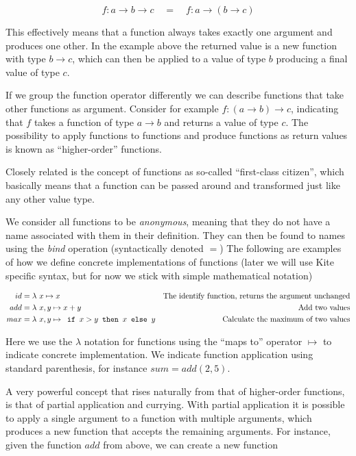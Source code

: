 \[ f: a \to b \to c \quad = \quad f: a \to (b \to c) \]

This effectively means that a function always takes exactly one argument and produces one other. In the example above the returned value is a new function with type $b \to c$, which can then be applied to a value of type $b$ producing a final value of type $c$.

If we group the function operator differently we can describe functions that take other functions as argument. Consider for example $f: (a \to b) \to c$, indicating that $f$ takes a function of type $a \to b$ and returns a value of type $c$. The possibility to apply functions to functions and produce functions as return values is known as ``higher-order'' functions.

Closely related is the concept of functions as so-called ``first-class citizen'', which basically means that a function can be passed around and transformed just like any other value type.

We consider all functions to be \emph{anonymous}, meaning that they do not have a name associated with them in their definition. They can then be found to names using the \emph{bind} operation (syntactically denoted $=$) The following are examples of how we define concrete implementations of functions (later we will use Kite specific syntax, but for now we stick with simple mathematical notation)

\begin{align*}
id &= \lambda{} \ x \mapsto{} x & \text{The identify function, returns the argument unchanged}\\
add &= \lambda{} \  x, y  \mapsto{}  x + y   & \text{Add two values}\\
max &= \lambda{} \  x, y  \mapsto{}  \texttt{ if } x > y \texttt{ then } x \texttt{ else } y   & \text{Calculate the maximum of two values}\\
\end{align*}

Here we use the $\lambda$ notation for functions using the ``maps to'' operator $\mapsto$ to indicate concrete implementation. We indicate function application using standard parenthesis, for instance $sum = add(2, 5)$.

A very powerful concept that rises naturally from that of higher-order functions, is that of partial application and currying. With partial application it is possible to apply a single argument to a function with multiple arguments, which produces a new function that accepts the remaining arguments. For instance, given the function $add$ from above, we can create a new function 

